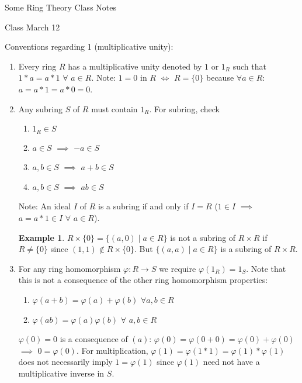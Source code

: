 \documentclass[11pt]{article}
\theoremstyle{definition}
\newtheorem{example}[thm]{Example}
\numberwithin{equation}{section}
\begin{document}
\begin{center}
{\sf\LARGE Some Ring Theory Class Notes}
\end{center}

\begin{center}
{\sf\LARGE Class March 12}
\end{center}

Conventions regarding 1 (multiplicative unity):
\begin{enumerate}
    \item Every ring $R$ has a multiplicative unity denoted by $1$ or $1_R$ such that $1*a = a*1$ $\forall$ $a \in R$. Note: $1 = 0$ in $R$ $\Leftrightarrow$ $R = \{0\}$ because $\forall a \in R$: $a = a * 1 = a * 0 = 0$.
    \item Any subring $S$ of $R$ must contain $1_R$. For subring, check
    \begin{enumerate}
        \item $1_{R} \in S$
        \item $a \in S$ $\implies$ $-a \in S$
        \item $a, b \in S$ $\implies$ $a + b \in S$
        \item $a, b \in S$ $\implies$ $ab \in S$
    \end{enumerate}
    Note: An ideal $I$ of $R$ is a subring if and only if $I = R$ ($1 \in I$ $\implies$ $a = a*1 \in I$ $\forall$ $a \in R$).\\
    \begin{example}
    $R \times \{0\} = \{(a, 0) \mid a \in R\}$ is not a subring of $R \times R$ if $R \neq \{0\}$ since $(1, 1) \notin R \times \{0\}$. But $\{(a, a) \mid a \in R\}$ is a subring of $R \times R$.
    \end{example}
    \item For any ring homomorphism $\varphi: R \rightarrow S$ we require $\varphi(1_R) = 1_S$. Note that this is not a consequence of the other ring homomorphism properties:
    \begin{enumerate}
        \item $\varphi(a + b) = \varphi(a) + \varphi(b)$ $\forall a, b \in R$
        \item $\varphi(ab) = \varphi(a)\varphi(b)$ $\forall$ $a, b \in R$
    \end{enumerate}
    $\varphi(0) = 0$ is a consequence of $(a)$: $\varphi(0) = \varphi(0 + 0) = \varphi(0) + \varphi(0)$ $\implies $ $0 = \varphi(0)$. For multiplication, $\varphi(1) = \varphi(1*1) = \varphi(1)*\varphi(1)$ does not necessarily imply $1 = \varphi(1)$ since $\varphi(1)$ need not have a multiplicative inverse in $S$.

\end{enumerate}
\end{document}
